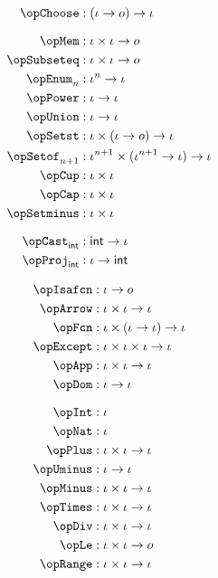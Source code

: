 \documentclass[11pt, a4paper, oneside]{article}
\begin{document}
\begin{minipage}[t]{.5\textwidth}
    \begin{align*}
        \opChoose       &: (\idv \arr o) \arr \idv \\[7pt]
        \opMem          &: \idv \times \idv \arr o \\
        \opSubseteq     &: \idv \times \idv \arr o \\
        \opEnum_n       &: \idv^n \arr \idv \\
        \opPower        &: \idv \arr \idv \\
        \opUnion        &: \idv \arr \idv \\
        \opSetst        &: \idv \times (\idv \arr o) \arr \idv \\
        \opSetof_{n+1}  &: \idv^{n+1} \times (\idv^{n+1} \arr \idv) \arr \idv \\
        \opCup          &: \idv \times \idv \\
        \opCap          &: \idv \times \idv \\
        \opSetminus     &: \idv \times \idv \\[7pt]
        \opCast_\int    &: \int \arr \idv \\
        \opProj_\int    &: \idv \arr \int \\
    \end{align*}
\end{minipage}%
\begin{minipage}[t]{.5\textwidth}
    \begin{align*}
        \opIsafcn       &: \idv \arr o \\
        \opArrow        &: \idv \times \idv \arr \idv \\
        \opFcn          &: \idv \times (\idv \arr \idv) \arr \idv \\
        \opExcept       &: \idv \times \idv \times \idv \arr \idv \\
        \opApp          &: \idv \times \idv \arr \idv \\
        \opDom          &: \idv \arr \idv \\[7pt]
        \opInt          &: \idv \\
        \opNat          &: \idv \\
        \opPlus         &: \idv \times \idv \arr \idv \\
        \opUminus       &: \idv \arr \idv \\
        \opMinus        &: \idv \times \idv \arr \idv \\
        \opTimes        &: \idv \times \idv \arr \idv \\
        \opDiv          &: \idv \times \idv \arr \idv \\
        \opLe           &: \idv \times \idv \arr o \\
        \opRange        &: \idv \times \idv \arr \idv
    \end{align*}
\end{minipage}
\end{document}
